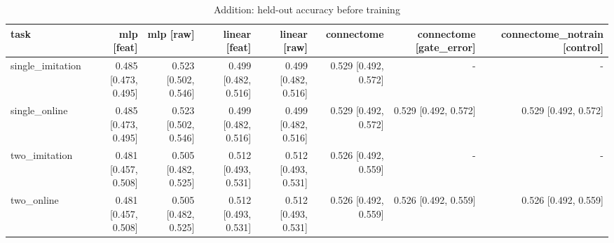 \begin{table}[t]
\centering
\small
\begin{tabular}{lrrrrrrr}
\toprule
task & mlp [feat] & mlp [raw] & linear [feat] & linear [raw] & connectome & connectome [gate\_error] & connectome\_notrain [control] \\
\midrule
single\_imitation & 0.485 [0.473, 0.495] & 0.523 [0.502, 0.546] & 0.499 [0.482, 0.516] & 0.499 [0.482, 0.516] & 0.529 [0.492, 0.572] & - & - \\
single\_online & 0.485 [0.473, 0.495] & 0.523 [0.502, 0.546] & 0.499 [0.482, 0.516] & 0.499 [0.482, 0.516] & 0.529 [0.492, 0.572] & 0.529 [0.492, 0.572] & 0.529 [0.492, 0.572] \\
two\_imitation & 0.481 [0.457, 0.508] & 0.505 [0.482, 0.525] & 0.512 [0.493, 0.531] & 0.512 [0.493, 0.531] & 0.526 [0.492, 0.559] & - & - \\
two\_online & 0.481 [0.457, 0.508] & 0.505 [0.482, 0.525] & 0.512 [0.493, 0.531] & 0.512 [0.493, 0.531] & 0.526 [0.492, 0.559] & 0.526 [0.492, 0.559] & 0.526 [0.492, 0.559] \\
\bottomrule
\end{tabular}
\caption{Addition: held-out accuracy before training}
\label{tab:addition_pre_acc}
\end{table}
